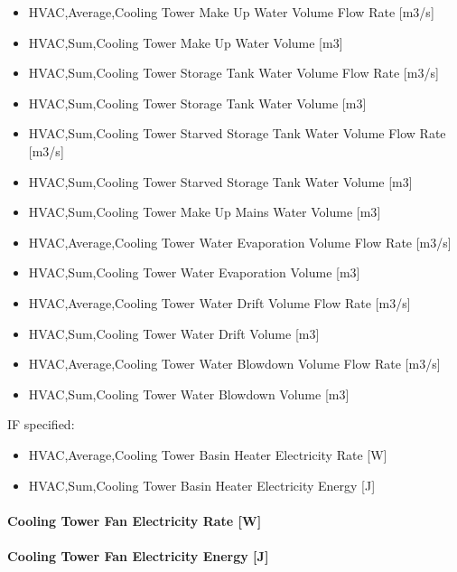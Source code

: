 \begin{itemize}
\item
  HVAC,Average,Cooling Tower Make Up Water Volume Flow Rate {[}m3/s{]}
\item
  HVAC,Sum,Cooling Tower Make Up Water Volume {[}m3{]}
\item
  HVAC,Sum,Cooling Tower Storage Tank Water Volume Flow Rate {[}m3/s{]}
\item
  HVAC,Sum,Cooling Tower Storage Tank Water Volume {[}m3{]}
\item
  HVAC,Sum,Cooling Tower Starved Storage Tank Water Volume Flow Rate {[}m3/s{]}
\item
  HVAC,Sum,Cooling Tower Starved Storage Tank Water Volume {[}m3{]}
\item
  HVAC,Sum,Cooling Tower Make Up Mains Water Volume {[}m3{]}
\item
  HVAC,Average,Cooling Tower Water Evaporation Volume Flow Rate {[}m3/s{]}
\item
  HVAC,Sum,Cooling Tower Water Evaporation Volume {[}m3{]}
\item
  HVAC,Average,Cooling Tower Water Drift Volume Flow Rate {[}m3/s{]}
\item
  HVAC,Sum,Cooling Tower Water Drift Volume {[}m3{]}
\item
  HVAC,Average,Cooling Tower Water Blowdown Volume Flow Rate {[}m3/s{]}
\item
  HVAC,Sum,Cooling Tower Water Blowdown Volume {[}m3{]}
\end{itemize}

IF specified:

\begin{itemize}
\item
  HVAC,Average,Cooling Tower Basin Heater Electricity Rate {[}W{]}
\item
  HVAC,Sum,Cooling Tower Basin Heater Electricity Energy {[}J{]}
\end{itemize}

\paragraph{Cooling Tower Fan Electricity Rate {[}W{]}}\label{cooling-tower-fan-electric-power-w-2}

\paragraph{Cooling Tower Fan Electricity Energy {[}J{]}}\label{cooling-tower-fan-electric-energy-j-2}

